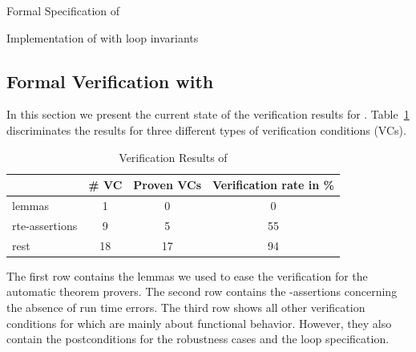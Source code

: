 \begin{listing}[hbt]
\begin{minipage}{\textwidth}

\end{minipage}
\caption{\label{lst:spec-poke} Formal Specification of \poke}
\end{listing}


\clearpage

\begin{listing}[hbt]
\begin{minipage}{\textwidth}

\end{minipage}
\caption{\label{lst:spec-poke} Implementation of \poke with loop invariants}
\end{listing}

\clearpage

\subsection{Formal Verification with \framacwp}
\label{sec:verification}
\label{verification-peek}


In this section we present the current state of the verification results 
for \peek.
Table~\ref{tab:results-peek} discriminates the results for
three different types of verification conditions (VCs).

\begin{table}[hbt]
  \centering
  \begin{tabular}[htb]{lccc}
    \toprule
     & \# VC & Proven VCs & Verification rate in \%\\
    \midrule
    lemmas & 1 &0 & 0 \\
    rte-assertions&9&5&55\\
    rest &18 &17&94\\
    \bottomrule
  \end{tabular}
  \caption{Verification Results of \peek}
  \label{tab:results-peek}
\end{table}


The first row contains the lemmas we used to ease the verification for the automatic theorem provers.
The second row contains the -assertions 
concerning the absence of run time errors.
The third row shows all other verification conditions for \peek
which are mainly about functional behavior.
However, they also contain the postconditions for the robustness cases
and the loop specification.

